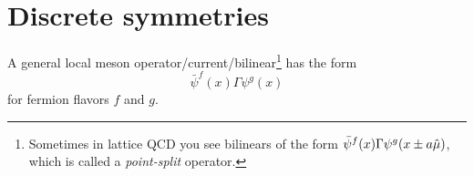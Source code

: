 



\section{Discrete symmetries}\label{sec:discreteSymm}

A general local meson operator/current/bilinear\footnote{Sometimes in lattice
QCD you see bilinears of the form $\bar{\psi}^f(x)\Gamma\psi^g(x\pm a\hat{\mu})$,
which is called a {\it point-split} operator.} has the form
\begin{equation}\label{eq:mesonInterpLat}
  \bar{\psi}^f(x)\Gamma\psi^g(x)
\end{equation}
for fermion flavors $f$ and $g$.


